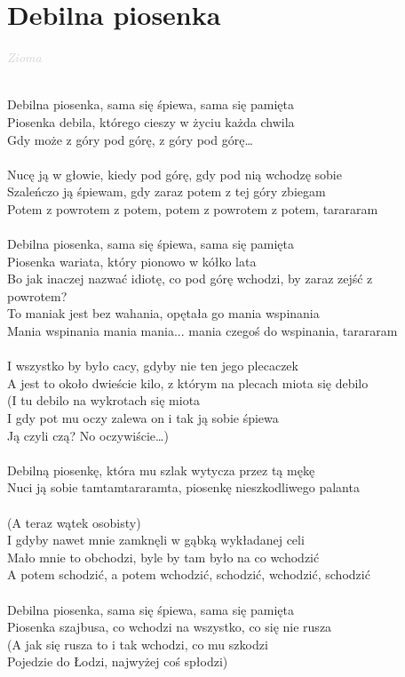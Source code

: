 \documentclass[a5paper, 10pt]{book}
\begin{document}
\newpage
\section{Debilna piosenka}\textcolor{lightgray}{\textit{Zioma}}\\~\\
\begin{minipage}[t]{0.85\textwidth}
  Debilna piosenka, sama się śpiewa, sama się pamięta\\
  Piosenka debila, którego cieszy w życiu każda chwila\\
  Gdy może z góry pod górę, z góry pod górę…\\
  \\
  Nucę ją w głowie, kiedy pod górę, gdy pod nią wchodzę sobie\\
  Szaleńczo ją śpiewam, gdy zaraz potem z tej góry zbiegam\\
  Potem z powrotem z potem, potem z powrotem z potem, tarararam\\
  \\
  Debilna piosenka, sama się śpiewa, sama się pamięta\\
  Piosenka wariata, który pionowo w kółko lata\\
  Bo jak inaczej nazwać idiotę, co pod górę wchodzi, by zaraz zejść z\\
  powrotem?\\
  To maniak jest bez wahania, opętała go mania wspinania\\
  Mania wspinania mania mania... mania czegoś do wspinania, tarararam\\
  \\
  I wszystko by było cacy, gdyby nie ten jego plecaczek\\
  A jest to około dwieście kilo, z którym na plecach miota się debilo\\
  (I tu debilo na wykrotach się miota\\
  I gdy pot mu oczy zalewa on i tak ją sobie śpiewa\\
  Ją czyli czą? No oczywiście…)\\
  \\
  Debilną piosenkę, która mu szlak wytycza przez tą mękę\\
  Nuci ją sobie tamtamtararamta, piosenkę nieszkodliwego palanta\\
  \\
  (A teraz wątek osobisty)\\
  I gdyby nawet mnie zamknęli w gąbką wykładanej celi\\
  Mało mnie to obchodzi, byle by tam było na co wchodzić\\
  A potem schodzić, a potem wchodzić, schodzić, wchodzić, schodzić\\
  \\
  Debilna piosenka, sama się śpiewa, sama się pamięta\\
  Piosenka szajbusa, co wchodzi na wszystko, co się nie rusza\\
  (A jak się rusza to i tak wchodzi, co mu szkodzi\\
  Pojedzie do Łodzi, najwyżej coś spłodzi)\\


\end{minipage}
\end{document}
